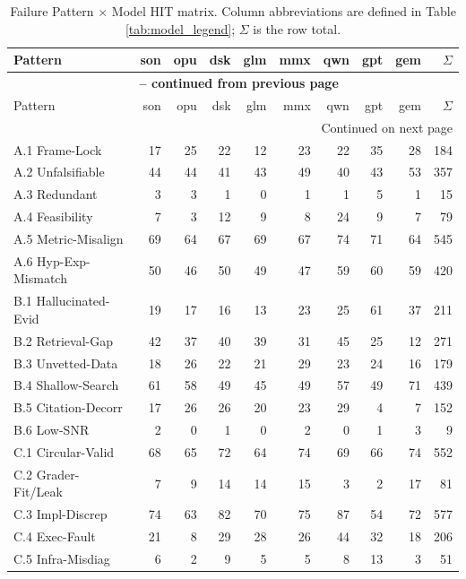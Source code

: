 \begin{longtable}{lrrrrrrrrr}
\caption{Failure Pattern $\times$ Model HIT matrix. Column abbreviations
are defined in Table \ref{tab:model_legend}; $\Sigma$ is the row total.} \label{tab:appendix_hit_matrix} \\
\toprule
Pattern & son & opu & dsk & glm & mmx & qwn & gpt & gem & $\Sigma$ \\
\midrule
\endfirsthead
\multicolumn{10}{c}{{\bfseries \tablename\ \thetable{} -- continued from previous page}} \\
\toprule
Pattern & son & opu & dsk & glm & mmx & qwn & gpt & gem & $\Sigma$ \\
\midrule
\endhead
\midrule
\multicolumn{10}{r}{{Continued on next page}} \\
\endfoot
\bottomrule
\endlastfoot
A.1 Frame-Lock & 17 & 25 & 22 & 12 & 23 & 22 & 35 & 28 & 184 \\
A.2 Unfalsifiable & 44 & 44 & 41 & 43 & 49 & 40 & 43 & 53 & 357 \\
A.3 Redundant & 3 & 3 & 1 & 0 & 1 & 1 & 5 & 1 & 15 \\
A.4 Feasibility & 7 & 3 & 12 & 9 & 8 & 24 & 9 & 7 & 79 \\
A.5 Metric-Misalign & 69 & 64 & 67 & 69 & 67 & 74 & 71 & 64 & 545 \\
A.6 Hyp-Exp-Mismatch & 50 & 46 & 50 & 49 & 47 & 59 & 60 & 59 & 420 \\
B.1 Hallucinated-Evid & 19 & 17 & 16 & 13 & 23 & 25 & 61 & 37 & 211 \\
B.2 Retrieval-Gap & 42 & 37 & 40 & 39 & 31 & 45 & 25 & 12 & 271 \\
B.3 Unvetted-Data & 18 & 26 & 22 & 21 & 29 & 23 & 24 & 16 & 179 \\
B.4 Shallow-Search & 61 & 58 & 49 & 45 & 49 & 57 & 49 & 71 & 439 \\
B.5 Citation-Decorr & 17 & 26 & 26 & 20 & 23 & 29 & 4 & 7 & 152 \\
B.6 Low-SNR & 2 & 0 & 1 & 0 & 2 & 0 & 1 & 3 & 9 \\
C.1 Circular-Valid & 68 & 65 & 72 & 64 & 74 & 69 & 66 & 74 & 552 \\
C.2 Grader-Fit/Leak & 7 & 9 & 14 & 14 & 15 & 3 & 2 & 17 & 81 \\
C.3 Impl-Discrep & 74 & 63 & 82 & 70 & 75 & 87 & 54 & 72 & 577 \\
C.4 Exec-Fault & 21 & 8 & 29 & 28 & 26 & 44 & 32 & 18 & 206 \\
C.5 Infra-Misdiag & 6 & 2 & 9 & 5 & 5 & 8 & 13 & 3 & 51 \\

\end{longtable}
